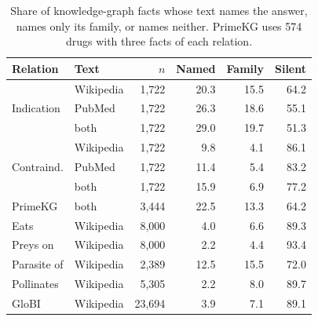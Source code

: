 \begin{table}[t]
\centering
\small
\setlength{\tabcolsep}{4pt}
\begin{tabular}{@{}llrrrr@{}}
\toprule
Relation & Text & $n$ & Named & Family & Silent \\
\midrule
\multirow{3}{*}{Indication} & Wikipedia & 1,722 & 20.3 & 15.5 & 64.2 \\
 & PubMed & 1,722 & 26.3 & 18.6 & 55.1 \\
 & both & 1,722 & 29.0 & 19.7 & 51.3 \\
\midrule
\multirow{3}{*}{Contraind.} & Wikipedia & 1,722 & 9.8 & 4.1 & 86.1 \\
 & PubMed & 1,722 & 11.4 & 5.4 & 83.2 \\
 & both & 1,722 & 15.9 & 6.9 & 77.2 \\
\midrule
PrimeKG & both & 3,444 & 22.5 & 13.3 & 64.2 \\
\midrule
Eats & Wikipedia & 8,000 & 4.0 & 6.6 & 89.3 \\
Preys on & Wikipedia & 8,000 & 2.2 & 4.4 & 93.4 \\
Parasite of & Wikipedia & 2,389 & 12.5 & 15.5 & 72.0 \\
Pollinates & Wikipedia & 5,305 & 2.2 & 8.0 & 89.7 \\
\midrule
GloBI & Wikipedia & 23,694 & 3.9 & 7.1 & 89.1 \\
\bottomrule
\end{tabular}
\caption{Share of knowledge-graph facts whose text names the answer, names only its family, or names neither. PrimeKG uses 574 drugs with three facts of each relation.}
\label{tab:coverage}
\end{table}
